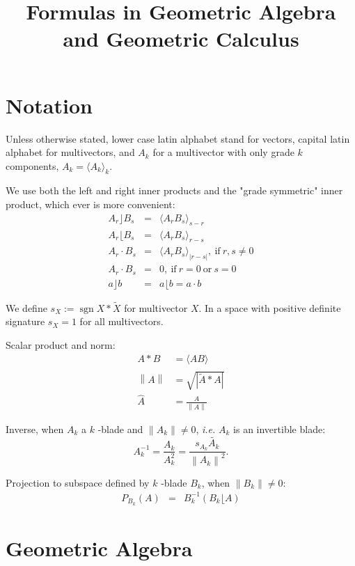 \documentclass[a4paper,12pt]{article}
\title{Formulas in Geometric Algebra and Geometric Calculus}
\author{}
\newcommand{\grade}[2]{\ensuremath{\langle#2\rangle_{#1}}}
\newcommand{\reverse}[1]{\tilde{#1}} %
\newcommand{\linner}{\ensuremath{\rfloor}}
\newcommand{\rinner}{\ensuremath{\lfloor}}
\providecommand{\abs}[1]{\lvert#1\rvert}
\providecommand{\norm}[1]{\left\lVert#1\right\rVert}
\providecommand{\normed}[1]{\hat{#1}}
\DeclareMathOperator{\sign}{sgn}
\providecommand{\signX}[1]{\ensuremath{s_{#1}}}
\begin{document}
\maketitle

\section{Notation}

Unless otherwise stated, lower case latin alphabet stand for vectors, capital latin alphabet for multivectors, and $A_k$ for a multivector with only grade $k$ components, $A_k = \grade{k}{A_k}$.

We use both the left and right inner products and the "grade symmetric" inner product, which ever is more convenient:
\begin{eqnarray}
A_r \linner B_s &=& \grade{s-r}{A_r B_s}\\
A_r \rinner B_s &=& \grade{r-s}{A_r B_s}\\
A_r \cdot B_s &=& \grade{\abs{r-s}}{A_r B_s},\ \textrm{if}\ r, s \neq 0\\
A_r \cdot B_s &=& 0,\ \textrm{if}\ r = 0\ \textrm{or}\ s = 0\\
a \linner b &=& a \rinner b = a \cdot b
\end{eqnarray}

We define $\signX{X} := \sign{X * \reverse{X}}$ for multivector $X$.
In a space with positive definite signature $\signX{X} = 1$ for all multivectors.

Scalar product and norm:
\begin{align}
 A * B &= \grade{}{AB}\\
 \norm{A} &= \sqrt{|\reverse{A} * A|}\\
 \normed{A} &= \frac{A}{\norm{A}}
\end{align}

Inverse, when $A_k$ a $k$ -blade and $\norm{A_k} \neq 0$, \emph{i.e.} $A_k$ is an invertible blade:
\begin{equation}
A_k^{-1} = \frac{A_k}{A_k^2} = \frac{\signX{A_k}\reverse{A_k}}{\norm{A_k}^2}.
\end{equation}

Projection to subspace defined by $k$ -blade $B_k$, when $\norm{B_k} \neq 0$:
\begin{eqnarray}
 P_{B_k}(A) &=& B^{-1}_{k}(B_k \rinner A)
\end{eqnarray}

\section{Geometric Algebra}
\end{document}
